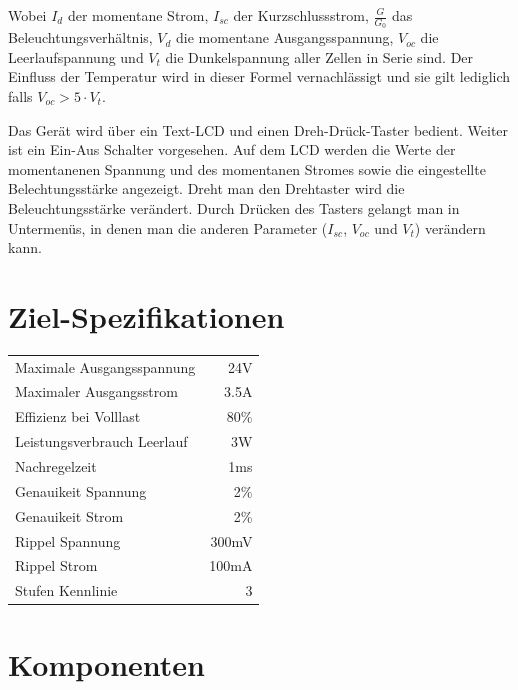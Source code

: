 \documentclass{article}
\begin{document}
Wobei   $I_{d}$   der   momentane  Strom,   $I_{sc}$   der   Kurzschlussstrom,
$\frac{G}{G_0}$    das   Beleuchtungsverh\"altnis,    $V_d$   die    momentane
Ausgangsspannung, $V_{oc}$  die Leerlaufspannung und $V_t$  die Dunkelspannung
aller Zellen in Serie sind. Der Einfluss der Temperatur wird in dieser Formel
vernachl\"assigt und sie gilt lediglich falls $V_{oc} > 5 \cdot V_t$.

Das   Ger\"at  wird   \"uber  ein   Text-LCD  und   einen  Dreh-Dr\"uck-Taster
bedient. Weiter  ist  ein  Ein-Aus  Schalter vorgesehen. Auf  dem  LCD  werden
die  Werte der  momentanenen Spannung  und  des momentanen  Stromes sowie  die
eingestellte Belechtungsst\"arke angezeigt. Dreht man  den Drehtaster wird die
Beleuchtungsst\"arke ver\"andert. Durch  Dr\"ucken des Tasters gelangt  man in
Untermen\"us,  in denen  man  die anderen  Parameter  ($I_{sc}$, $V_{oc}$  und
$V_t$) ver\"andern kann.

\section{Ziel-Spezifikationen}
\begin{center}
\begin{tabular}{lr}
    Maximale Ausgangsspannung	& 24V    \\
    Maximaler Ausgangsstrom		& 3.5A   \\
    Effizienz bei Volllast		& 80\%   \\
    Leistungsverbrauch Leerlauf	& 3W     \\
    Nachregelzeit				& 1ms    \\
    Genauikeit Spannung			& 2\%    \\
    Genauikeit Strom			& 2\%    \\
    Rippel Spannung				& 300mV  \\
    Rippel Strom				& 100mA  \\
    Stufen Kennlinie			& 3      \\
\end{tabular}
\end{center}

\section{Komponenten}
\end{document}
